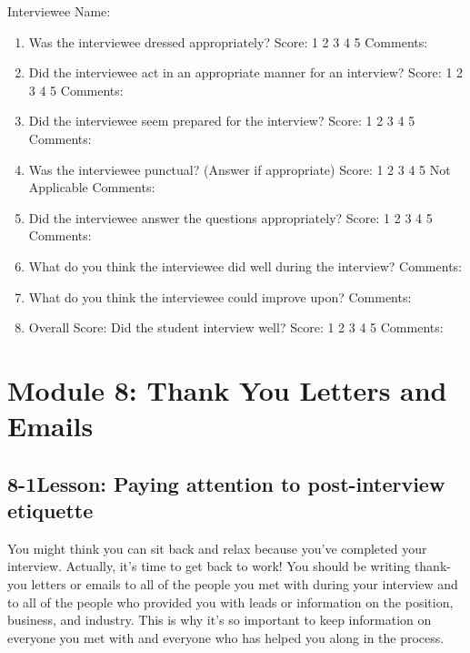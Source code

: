 Interviewee Name: \hrulefill
\begin{enumerate}[leftmargin=0.5cm]
	\item Was the interviewee dressed appropriately?
	      \break Score: 1 2 3 4 5
	      \break Comments:

	\item Did the interviewee act in an appropriate manner for an interview?
	      \break Score: 1 2 3 4 5
	      \break Comments:

	\item Did the interviewee seem prepared for the interview?
	      \break Score: 1 2 3 4 5
	      \break Comments:

	\item Was the interviewee punctual? (Answer if appropriate)
	      \break Score: 1 2 3 4 5 Not Applicable \break Comments:

	\item Did the interviewee answer the questions appropriately?
	      \break Score: 1 2 3 4 5
	      \break Comments:

	\item What do you think the interviewee did well during the interview?
	      \break Comments:

	\item What do you think the interviewee could improve upon?
	      \break Comments:

	\item Overall Score: Did the student interview well?
	      \break Score: 1 2 3 4 5
	      \break Comments:
\end{enumerate}

\pagebreak \section*{Module 8:	Thank You Letters and Emails}
\noindent\makebox[\textwidth]{\rule{\linewidth}{0.4pt}}  \localtableofcontents
\noindent\makebox[\textwidth]{\rule{\linewidth}{0.4pt}}


\pagebreak \subsection*{8-1\quad Lesson: Paying attention to post-interview etiquette}
You might think you can sit back and relax because you’ve completed your interview. Actually, it's time to get back to work! You should be writing thank-you letters or emails to all of the people you met with during your interview and to all of the people who provided you with leads or information on the position, business, and industry. This is why it's so important to keep information on everyone you met with and everyone who has helped you along in the process.

